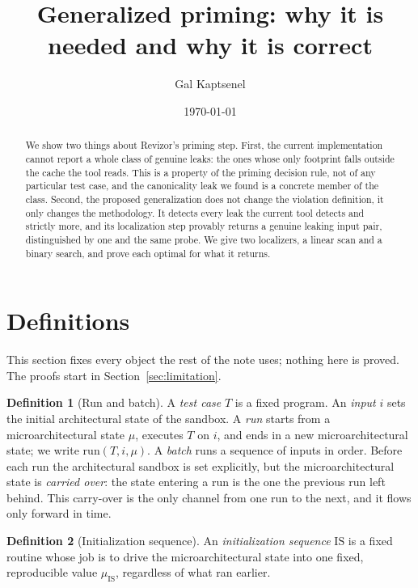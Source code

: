 \documentclass[11pt]{article}
\title{Generalized priming: why it is needed and why it is correct}
\author{Gal Kaptsenel}
\date{\today}
\theoremstyle{definition}
\newtheorem{definition}{Definition}
\theoremstyle{plain}
\newcommand{\run}{\mathrm{run}}
\newcommand{\IS}{\mathrm{IS}}
\begin{document}
\maketitle

\begin{abstract}
We show two things about Revizor's priming step. First, the current implementation
cannot report a whole class of genuine leaks: the ones whose only footprint falls
outside the cache the tool reads. This is a property of the priming decision rule, not
of any particular test case, and the canonicality leak we found is a concrete member
of the class. Second, the proposed generalization does not change the violation
definition, it only changes the methodology. It detects every leak the current tool
detects and strictly more, and its localization step provably returns a genuine
leaking input pair, distinguished by one and the same probe. We give two localizers, a
linear scan and a binary search, and prove each optimal for what it returns.
\end{abstract}

\section{Definitions}
\label{sec:defs}

This section fixes every object the rest of the note uses; nothing here is proved. The
proofs start in Section~\ref{sec:limitation}.

\begin{definition}[Run and batch]
\label{def:batch}
A \emph{test case} $T$ is a fixed program. An \emph{input} $i$ sets the initial
architectural state of the sandbox. A \emph{run} starts from a microarchitectural
state $\mu$, executes $T$ on $i$, and ends in a new microarchitectural state; we write
$\run(T,i,\mu)$. A \emph{batch} runs a sequence of inputs in order. Before each run the
architectural sandbox is set explicitly, but the microarchitectural state is
\emph{carried over}: the state entering a run is the one the previous run left behind.
This carry-over is the only channel from one run to the next, and it flows only forward
in time.
\end{definition}

\begin{definition}[Initialization sequence]
\label{def:is}
An \emph{initialization sequence} $\IS$ is a fixed routine whose job is to drive the
microarchitectural state into one fixed, reproducible value $\mu_\IS$, regardless of
what ran earlier.
\end{definition}
\end{document}
